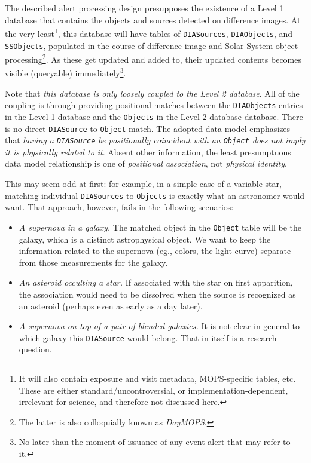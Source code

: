 \documentclass[12pt]{article}
\newcommand{\code}[1]{\texttt{#1}}
\newcommand{\DIASource}{\code{DIASource}\xspace}
\newcommand{\DIASources}{\code{DIASources}\xspace}
\newcommand{\DIAObjects}{\code{DIAObjects}\xspace}
\newcommand{\DB}{{Level 1 database}\xspace}
\newcommand{\DR}{{Level 2 database}\xspace}
\newcommand{\Object}{\code{Object}\xspace}
\newcommand{\Objects}{\code{Objects}\xspace}
\newcommand{\SSObjects}{\code{SSObjects}\xspace}
\begin{document}
The described alert processing design presupposes the existence of a \DB that
contains the objects and sources detected on difference images. At the very
least\footnote{It will also contain exposure and visit metadata, MOPS-specific
tables, etc. These are either standard/uncontroversial, or
implementation-dependent, irrelevant for science, and therefore not discussed
here.}, this database will have tables of \DIASources, \DIAObjects, and
\SSObjects, populated in the course of difference image and Solar System
object processing\footnote{The latter is also colloquially known as {\em
DayMOPS}.}. As these get updated and added to, their updated contents becomes
visible (queryable) immediately\footnote{No later than the moment of issuance
of any event alert that may refer to it.}.

Note that {\em this database is only loosely coupled to the \DR}. All of the
coupling is through providing positional matches between the \DIAObjects
entries in the \DB and the \Objects in the \DR database. There is no direct
\DIASource-to-\Object match. The adopted data model emphasizes that {\em
having a \DIASource be positionally coincident with an \Object does not imply
it is physically related to it}. Absent other information, the least
presumptuous data model relationship is one of {\em positional association},
not {\em physical identity}.

This may seem odd at first: for example, in a simple case of a variable star,
matching individual \DIASources to \Objects is exactly what an astronomer
would want. That approach, however, fails in the following scenarios:
\begin{itemize}
\item {\em A supernova in a galaxy.} The matched object in the \Object table
      will be the galaxy, which is a distinct astrophysical object. We want to
      keep the information related to the supernova (eg., colors, the light
      curve) separate from those measurements for the galaxy.
\item {\em An asteroid occulting a star.} If associated with the star on first
      apparition, the association would need to be dissolved when the source
      is recognized as an asteroid (perhaps even as early as a day later).
\item {\em A supernova on top of a pair of blended galaxies.} It is not clear
      in general to which galaxy this \DIASource would belong. That in itself
      is a research question.
\end{itemize}
\end{document}
